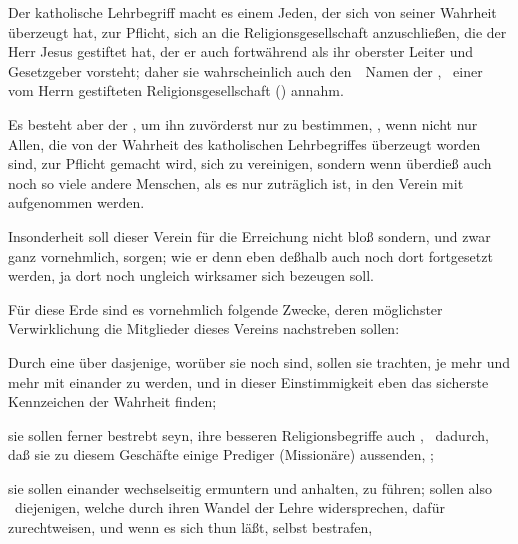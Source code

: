 \begin{aufza}
\item Der katholische Lehrbegriff macht es einem Jeden, der sich von seiner Wahrheit überzeugt hat, zur Pflicht, sich an die Religionsgesellschaft anzuschließen, die der Herr Jesus gestiftet hat, der er auch fortwährend als ihr oberster Leiter und Gesetzgeber vorsteht; daher sie wahrscheinlich auch den~\ Namen der , \dh\  einer vom Herrn gestifteten Religionsgesellschaft () annahm.
\item Es besteht aber der , um ihn zuvörderst nur  zu bestimmen, , wenn nicht nur Allen, die von der Wahrheit des katholischen Lehrbegriffes überzeugt worden sind, zur Pflicht gemacht wird, sich zu vereinigen, sondern wenn überdieß auch noch so viele andere Menschen, als es nur zuträglich ist, in den Verein mit aufgenommen werden.
\item Insonderheit soll dieser Verein für die Erreichung  nicht bloß  sondern, und zwar ganz vornehmlich,  sorgen; wie er denn eben deßhalb auch noch dort fortgesetzt werden, ja dort noch ungleich wirksamer sich bezeugen soll.
\item Für diese Erde sind es vornehmlich folgende Zwecke, deren möglichster Verwirklichung die Mitglieder dieses Vereins nachstreben sollen:
\begin{aufzb}
\item Durch eine  über dasjenige, worüber sie noch  sind, sollen sie trachten, je mehr und mehr  mit einander zu werden, und in dieser Einstimmigkeit eben das sicherste Kennzeichen der Wahrheit finden;
\item sie sollen ferner bestrebt seyn, ihre besseren Religionsbegriffe auch , \zB\  dadurch, daß sie zu diesem Geschäfte einige Prediger (Missionäre) aussenden, \udgl ;
\item sie sollen einander wechselseitig ermuntern und anhalten,  zu führen; sollen also \zB\  diejenigen, welche durch ihren Wandel der Lehre widersprechen, dafür zurechtweisen, und wenn es sich thun läßt, selbst bestrafen, \usw\;

\end{aufzb}
\end{aufza}
